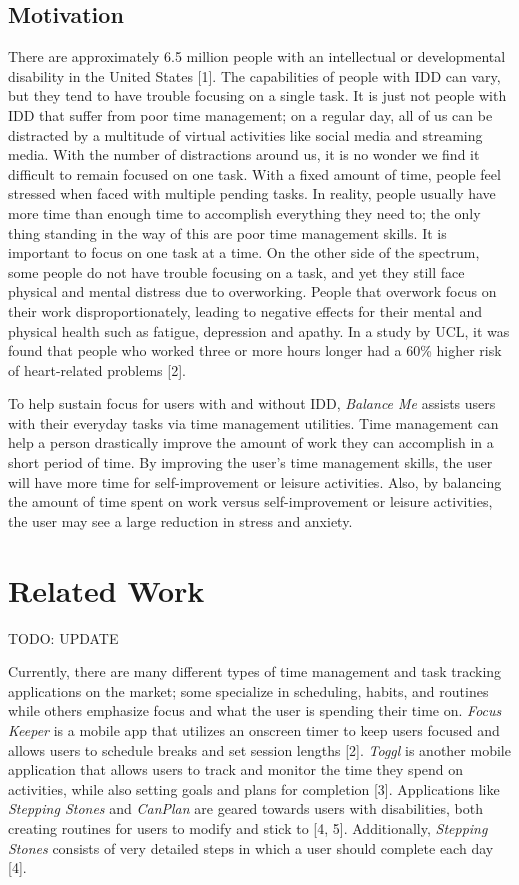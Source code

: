 \documentclass{sigchi}
\begin{document}
\subsection{Motivation}

There are approximately 6.5 million people with an intellectual or
developmental disability in the United States [1]. The capabilities of people
with IDD can vary, but they tend to have trouble focusing on a single task. It
is just not people with IDD that suffer from poor time management; on a regular
day, all of us can be distracted by a multitude of virtual activities like
social media and streaming media. With the number of distractions around us, it
is no wonder we find it difficult to remain focused on one task. With a fixed
amount of time, people feel stressed when faced with multiple pending tasks. In
reality, people usually have more time than enough time to accomplish
everything they need to; the only thing standing in the way of this are poor
time management skills. It is important to focus on one task at a time. On the
other side of the spectrum, some people do not have trouble focusing on a task,
and yet they still face physical and mental distress due to overworking. People
that overwork focus on their work disproportionately, leading to negative
effects for their mental and physical health such as fatigue, depression and
apathy. In a study by UCL, it was found that people who worked three or more
hours longer had a 60\% higher risk of heart-related problems [2].

To help sustain focus for users with and without IDD, \textit{Balance Me}
assists users with their everyday tasks via time management utilities. Time
management can help a person drastically improve the amount of work they can
accomplish in a short period of time. By improving the user’s time management
skills, the user will have more time for self-improvement or leisure
activities. Also, by balancing the amount of time spent on work versus
self-improvement or leisure activities, the user may see a large reduction in
stress and anxiety.


\section{Related Work}

TODO: UPDATE

Currently, there are many different types of time management and task tracking
applications on the market; some specialize in scheduling, habits, and routines
while others emphasize focus and what the user is spending their time on.
\textit{Focus Keeper} is a mobile app that utilizes an onscreen timer to keep
users focused and allows users to schedule breaks and set session lengths [2].
\textit{Toggl} is another mobile application that allows users to track and
monitor the time they spend on activities, while also setting goals and plans
for completion [3]. Applications like \textit{Stepping Stones} and
\textit{CanPlan} are geared towards users with disabilities, both creating
routines for users to modify and stick to [4, 5]. Additionally,
\textit{Stepping Stones} consists of very detailed steps in which a user should
complete each day [4].
\end{document}
